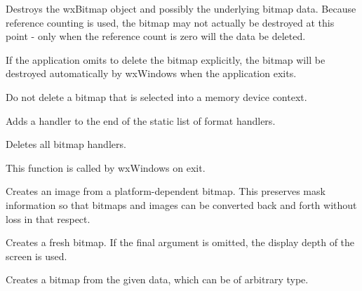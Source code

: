 Destroys the wxBitmap object and possibly the underlying bitmap data.
Because reference counting is used, the bitmap may not actually be
destroyed at this point - only when the reference count is zero will the
data be deleted.

If the application omits to delete the bitmap explicitly, the bitmap will be
destroyed automatically by wxWindows when the application exits.

Do not delete a bitmap that is selected into a memory device context.

\label{wxbitmapaddhandler}


Adds a handler to the end of the static list of format handlers.






Deletes all bitmap handlers.

This function is called by wxWindows on exit.

\label{wxbitmapconverttoimage}


Creates an image from a platform-dependent bitmap. This preserves
mask information so that bitmaps and images can be converted back
and forth without loss in that respect.

\label{wxbitmapcreate}


Creates a fresh bitmap. If the final argument is omitted, the display depth of
the screen is used.


Creates a bitmap from the given data, which can be of arbitrary type.

